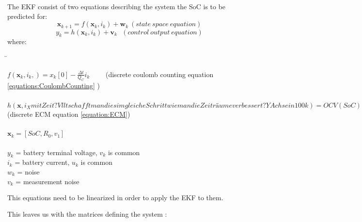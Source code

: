 The EKF consist of two equations describing the system the SoC is to be predicted for:
\begin{equation}
  {\boldsymbol {x}}_{k+1}=f({\boldsymbol {x}}_{k},{{i}}_{k})+ {\boldsymbol {w}}_{k}  \ (state\ space\ equation)  %
\end{equation}
\begin{equation}
 y_{k}=h({\boldsymbol  {x}}_{{k}}, {i}_{k})+{\boldsymbol  {v}}_{{k}}  \ \ \  (control\ output\ equation ) %
\end{equation}
where: 
\begin{tabbing}
\phantom{$v(t)  \  \ \ \  \ $}\= \kill

$f({\boldsymbol {x}}_{k}, {i}_{k},) = {x}_{k}[0] - \frac{\Delta t}{Q_{C}} i_{k} $ \ \ \ \ (discrete coulomb counting equation \ref{equations:CoulombCounting} ) \\\\
$h(\boldsymbol x,i_X mit Zeit? Vllt schafft man dies im gleiche Schritt wie man die Zeiträume verbessert? Y Achse in 100%
k) = OCV(SoC) + i_k R_0  +  v_1$ (discrete ECM equation \ref{equation:ECM})\\\\
$\boldsymbol x_{k} = [SoC, R_0, v_1]$ \\\\
$y_{k}$\> =  battery terminal voltage,  $v_{k}$ is common  \\
$i_{k}$\> =   battery current, $u_{k}$ is common  \\
$w_{k}$\> = noise    \\ 
$v_{k}$\> = measurement noise    \\
\end{tabbing}	


This equations need to be linearized in order to apply the EKF to them. 

This leaves us with the matrices defining the system : 

